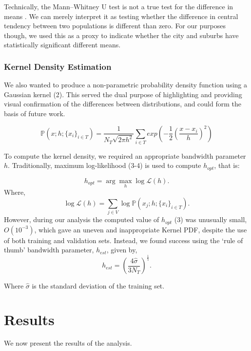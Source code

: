 \documentclass{article}
\begin{document}
Technically, the Mann–Whitney U test is not a true test for the difference in means \cite{macfarland2016mann}. We can merely interpret it as testing whether the difference in central tendency between two populations is different than zero. For our purposes though, we used this as a proxy to indicate whether the city and suburbs have statistically significant different means.

\subsubsection*{Kernel Density Estimation}
We also wanted to produce a non-parametric probability density function using a Gaussian kernel (2). This served the dual purpose of highlighting and providing visual confirmation of the differences between distributions, and could form the basis of future work. 

\begin{equation}
    \mathbb{P}(x;h;\{x_i\}_{i \in T}) = \frac{1}{N_{T} \sqrt{2 \pi h^2}} \sum_{i\in T} exp\left(-\frac{1}{2} \left(\frac{x - x_i}{h}\right)^2\right)
\end{equation}

To compute the kernel density, we required an appropriate bandwidth parameter $h$. Traditionally, maximum log-likelihood (3-4) is used to compute $h_{opt}$, that is:

\begin{equation}
    h_{opt} = \arg\max_{h} \log \mathcal{L}(h).
\end{equation}
Where,
\begin{equation}
    \log \mathcal{L}(h) = \sum_{j \in V} \log \mathbb{P}(x_{j};h;\{x_i\}_{i \in T}).
\end{equation}
However, during our analysis the computed value of $h_{opt}$ (3) was unusually small, $O(10^{-3})$, which gave an uneven and inappropriate Kernel PDF, despite the use of both training and validation sets. Instead, we found success using the `rule of thumb' \cite{silverman2018density} bandwidth parameter, $h_{est}$, given by,
\begin{equation}
    h_{est} = \left( \frac{4 \hat{\sigma}}{3 N_{T}} \right)^{\frac{1}{5}}.
\end{equation}

Where $\hat{\sigma}$ is the standard deviation of the training set.

\section{Results}
We now present the results of the analysis. 
\end{document}
